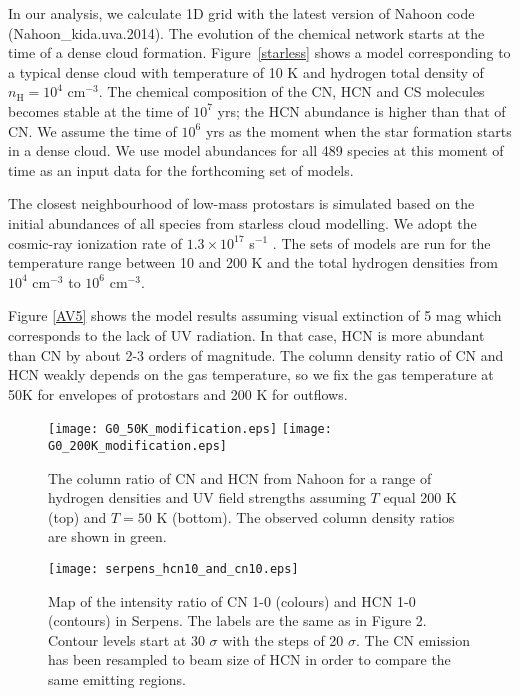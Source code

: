 \documentclass{aa}
\begin{document}
In our analysis, we calculate 1D grid with the latest version of Nahoon code (Nahoon\_kida.uva.2014). 
The evolution of the chemical network starts at the time of a dense cloud formation.
Figure~\ref{starless} shows a model corresponding to a typical dense cloud with temperature of 10 K
and hydrogen total density of $n_\mathrm{H} = 10^4$ cm$^{-3}$. The chemical composition
of the CN, HCN and CS molecules becomes stable at the time of $10^{7}$ yrs; the HCN abundance is higher
than that of CN. We assume the time of $10^{6}$ yrs as the moment when the star formation starts in
a dense cloud. We use model abundances for all 489 species at this moment of time 
as an input data for the forthcoming set of models.

The closest neighbourhood of low-mass protostars is simulated based on the initial abundances of
all species from starless cloud modelling. We adopt the cosmic-ray ionization
rate of $1.3\times 10^{17}$ s$^{-1}$ \citep{Cra78}. The sets of models are run
for the temperature range between 10 and 200 K and the total hydrogen densities from $10^4$
cm$^{-3}$ to $10^6$ cm$^{-3}$. 

Figure \ref{AV5} shows the model results assuming visual extinction of 5 mag which corresponds to the lack 
of UV radiation. In that case, HCN is more abundant than CN by about 2-3
orders of magnitude. The column density ratio of CN and HCN weakly depends on the 
gas temperature, so we fix the gas temperature at 50K for envelopes of protostars and 200 K for outflows.
\begin{figure} 
\centering \texttt{[image: G0\_50K\_modification.eps]} 
\texttt{[image: G0\_200K\_modification.eps]} 
\caption{The column ratio of CN and HCN from Nahoon for a 
range of hydrogen densities and UV field strengths assuming $T$ equal 200 K (top) 
and $T = 50$ K (bottom). The observed column density ratios are shown in green.} 
\label{G0_50} 
\end{figure}
\begin{figure} 
\centering 
\texttt{[image: serpens\_hcn10\_and\_cn10.eps]}
\caption{Map of the intensity ratio of CN 1-0 (colours) and HCN 1-0
(contours) in Serpens. The labels are the same as in Figure 2. Contour levels start at 30 $\sigma$ with the steps of 20 $\sigma$.
The CN emission has been resampled to beam size of HCN in order to compare the same emitting regions.} 
\label{cn10_and_hcn10} 
\end{figure}
\end{document}
